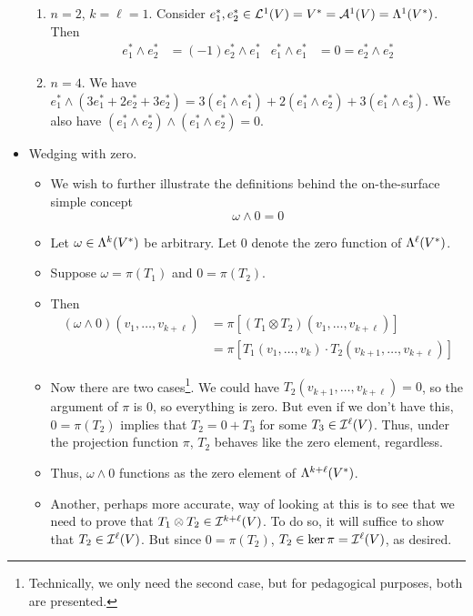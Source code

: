 \documentclass[../notes.tex]{subfiles}
\begin{document}
\begin{itemize}
\begin{enumerate}
        \item $n=2$, $k=\ell=1$. Consider $e_1^*,e_2^*\in\lin[1]{V}=V^*=\alt[1]{V}=\lam[1]{V^*}$. Then
        \begin{align*}
            e_1^*\wedge e_2^* &= (-1)e_2^*\wedge e_1^*&
            e_1^*\wedge e_1^* &= 0 = e_2^*\wedge e_2^*
        \end{align*}
        \item $n=4$. We have $e_1^*\wedge(3e_1^*+2e_2^*+3e_2^*)=3(e_1^*\wedge e_1^*)+2(e_1^*\wedge e_2^*)+3(e_1^*\wedge e_3^*)$. We also have $(e_1^*\wedge e_2^*)\wedge(e_1^*\wedge e_2^*)=0$.
    \end{enumerate}
    \item Wedging with zero.
    \begin{itemize}
        \item We wish to further illustrate the definitions behind the on-the-surface simple concept
        \begin{equation*}
            \omega\wedge 0 = 0
        \end{equation*}
        \item Let $\omega\in\lam[k]{V^*}$ be arbitrary. Let 0 denote the zero function of $\lam[\ell]{V^*}$.
        \item Suppose $\omega=\pi(T_1)$ and $0=\pi(T_2)$.
        \item Then
        \begin{align*}
            (\omega\wedge 0)(v_1,\dots,v_{k+\ell}) &= \pi[(T_1\otimes T_2)(v_1,\dots,v_{k+\ell})]\\
            &= \pi[T_1(v_1,\dots,v_k)\cdot T_2(v_{k+1},\dots,v_{k+\ell})]
        \end{align*}
        \item Now there are two cases\footnote{Technically, we only need the second case, but for pedagogical purposes, both are presented.}. We could have $T_2(v_{k+1},\dots,v_{k+\ell})=0$, so the argument of $\pi$ is 0, so everything is zero. But even if we don't have this, $0=\pi(T_2)$ implies that $T_2=0+T_3$ for some $T_3\in\ide[\ell]{V}$. Thus, under the projection function $\pi$, $T_2$ behaves like the zero element, regardless.
        \item Thus, $\omega\wedge 0$ functions as the zero element of $\lam[k+\ell]{V^*}$.
        \item Another, perhaps more accurate, way of looking at this is to see that we need to prove that $T_1\otimes T_2\in\ide[k+\ell]{V}$. To do so, it will suffice to show that $T_2\in\ide[\ell]{V}$. But since $0=\pi(T_2)$, $T_2\in\ker\pi=\ide[\ell]{V}$, as desired.
    \end{itemize}
\end{itemize}
\end{document}
